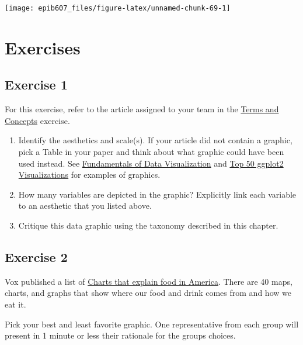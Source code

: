 \documentclass[]{book}
\providecommand{\tightlist}{%
  \setlength{\itemsep}{0pt}\setlength{\parskip}{0pt}}
\providecommand{\tightlist}{%
  \setlength{\itemsep}{0pt}\setlength{\parskip}{0pt}}
\theoremstyle{definition}
\theoremstyle{definition}
\theoremstyle{definition}
\theoremstyle{remark}
\begin{document}
\begin{center}\texttt{[image: epib607\_files/figure-latex/unnamed-chunk-69-1]} \end{center}

\section{Exercises}\label{exercises}

\subsection{Exercise 1}\label{exercise-1}

For this exercise, refer to the article assigned to your team in the
\href{https://sahirbhatnagar.com/EPIB607/terms-and-concepts.html}{Terms
and Concepts} exercise.

\begin{enumerate}
\def\labelenumi{\arabic{enumi}.}
\tightlist
\item
  Identify the aesthetics and scale(s). If your article did not contain
  a graphic, pick a Table in your paper and think about what graphic
  could have been used instead. See
  \href{https://serialmentor.com/dataviz/directory-of-visualizations.html}{Fundamentals
  of Data Visualization} and
  \href{http://r-statistics.co/Top50-Ggplot2-Visualizations-MasterList-R-Code.html\#1.\%20Correlation}{Top
  50 ggplot2 Visualizations} for examples of graphics.
\item
  How many variables are depicted in the graphic? Explicitly link each
  variable to an aesthetic that you listed above.
\item
  Critique this data graphic using the taxonomy described in this
  chapter.
\end{enumerate}

\subsection{Exercise 2}\label{exercise-2}

Vox published a list of
\href{http://www.vox.com/a/explain-food-america}{Charts that explain
food in America}. There are 40 maps, charts, and graphs that show where
our food and drink comes from and how we eat it.

Pick your best and least favorite graphic. One representative from each
group will present in 1 minute or less their rationale for the groups
choices.

\appendix
\end{document}
